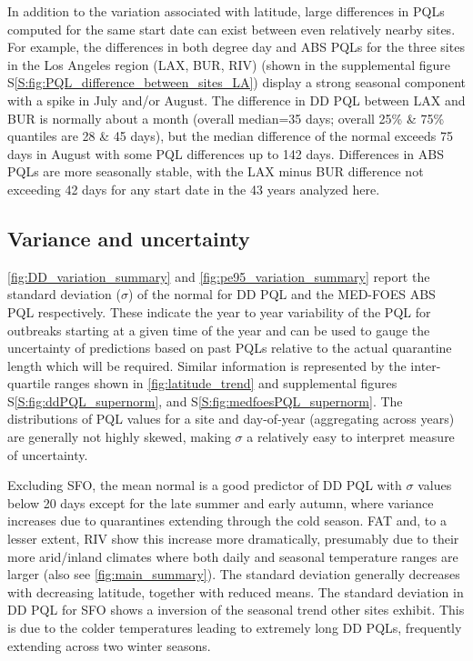 \documentclass[10pt,a4paper,twocolumn]{article}
\begin{document}
In addition to the variation associated with latitude, 
large differences in PQLs computed for the same start date
can exist between even relatively nearby sites.
For example, the differences in both degree day and ABS PQLs 
for the three sites in the Los Angeles region (LAX, BUR, RIV) 
(shown in the supplemental figure S\ref{S:fig:PQL_difference_between_sites_LA})
display a strong seasonal component with a spike in July and/or August.
The difference in DD PQL between LAX and BUR is normally about a month
(overall median=35 days; overall 25\% \& 75\% quantiles are 28 \& 45 days), 
but the median difference of the normal exceeds 75 days in August with some 
PQL differences up to 142 days.
Differences in ABS PQLs are more seasonally stable, 
with the LAX minus BUR difference not exceeding 42 days
for any start date in the 43 years analyzed here.


\subsection*{Variance and uncertainty}

\autoref{fig:DD_variation_summary} and \autoref{fig:pe95_variation_summary}
report the standard deviation ($\sigma$) of the normal for DD PQL and the MED-FOES ABS PQL 
respectively.
These indicate the year to year variability of the PQL for outbreaks starting at a
given time of the year and can be used to gauge the uncertainty of predictions based on 
past PQLs relative to the actual quarantine length which will be required.
Similar information is represented by the inter-quartile ranges 
shown in \autoref{fig:latitude_trend} and supplemental figures
S\ref{S:fig:ddPQL_supernorm},
and S\ref{S:fig:medfoesPQL_supernorm}.
The distributions of PQL values for a site and day-of-year (aggregating across years) 
are generally not highly skewed, making $\sigma$ a relatively easy to interpret measure of uncertainty.

Excluding SFO, the mean normal is a good predictor of DD PQL with $\sigma$ values below 20 days
except for the late summer and early autumn, where variance increases 
due to quarantines extending through the cold season.
FAT and, to a lesser extent, RIV show this increase more dramatically, presumably due to their more 
arid/inland climates where both daily and seasonal temperature ranges are larger
(also see \autoref{fig:main_summary}).
The standard deviation generally decreases with decreasing latitude, together with reduced means.
The standard deviation in DD PQL for SFO shows a inversion of the seasonal trend 
other sites exhibit.
This is due to the colder temperatures leading to extremely long DD PQLs, 
frequently extending across two winter seasons.
\end{document}
